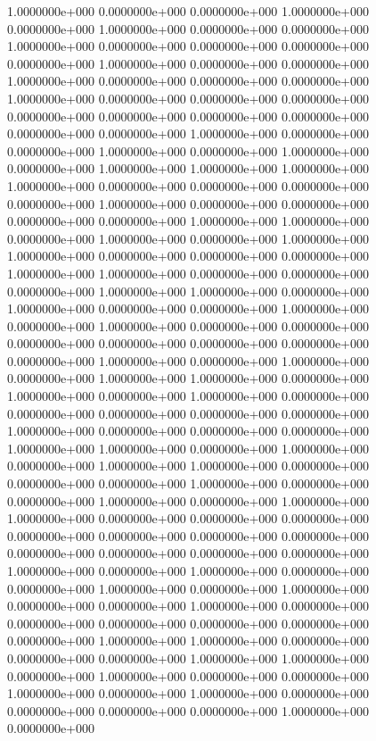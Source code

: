   1.0000000e+000  0.0000000e+000  0.0000000e+000  1.0000000e+000  0.0000000e+000
  1.0000000e+000  0.0000000e+000  0.0000000e+000  1.0000000e+000  0.0000000e+000
  0.0000000e+000  0.0000000e+000  0.0000000e+000  1.0000000e+000  0.0000000e+000
  0.0000000e+000  1.0000000e+000  0.0000000e+000  0.0000000e+000  0.0000000e+000
  1.0000000e+000  0.0000000e+000  0.0000000e+000  0.0000000e+000  0.0000000e+000
  0.0000000e+000  0.0000000e+000  0.0000000e+000  0.0000000e+000  0.0000000e+000
  1.0000000e+000  0.0000000e+000  0.0000000e+000  1.0000000e+000  0.0000000e+000
  1.0000000e+000  0.0000000e+000  1.0000000e+000  1.0000000e+000  1.0000000e+000
  1.0000000e+000  0.0000000e+000  0.0000000e+000  0.0000000e+000  0.0000000e+000
  1.0000000e+000  0.0000000e+000  0.0000000e+000  0.0000000e+000  0.0000000e+000
  1.0000000e+000  1.0000000e+000  0.0000000e+000  1.0000000e+000  0.0000000e+000
  1.0000000e+000  1.0000000e+000  0.0000000e+000  0.0000000e+000  0.0000000e+000
  1.0000000e+000  1.0000000e+000  0.0000000e+000  0.0000000e+000  0.0000000e+000
  1.0000000e+000  1.0000000e+000  0.0000000e+000  1.0000000e+000  0.0000000e+000
  0.0000000e+000  1.0000000e+000  0.0000000e+000  1.0000000e+000  0.0000000e+000
  0.0000000e+000  0.0000000e+000  0.0000000e+000  0.0000000e+000  0.0000000e+000
  0.0000000e+000  1.0000000e+000  0.0000000e+000  1.0000000e+000  0.0000000e+000
  1.0000000e+000  1.0000000e+000  0.0000000e+000  1.0000000e+000  0.0000000e+000
  1.0000000e+000  0.0000000e+000  0.0000000e+000  0.0000000e+000  0.0000000e+000
  0.0000000e+000  1.0000000e+000  0.0000000e+000  0.0000000e+000  0.0000000e+000
  1.0000000e+000  1.0000000e+000  0.0000000e+000  1.0000000e+000  0.0000000e+000
  1.0000000e+000  1.0000000e+000  0.0000000e+000  0.0000000e+000  0.0000000e+000
  1.0000000e+000  0.0000000e+000  0.0000000e+000  1.0000000e+000  0.0000000e+000
  1.0000000e+000  1.0000000e+000  0.0000000e+000  0.0000000e+000  0.0000000e+000
  0.0000000e+000  0.0000000e+000  0.0000000e+000  0.0000000e+000  0.0000000e+000
  0.0000000e+000  0.0000000e+000  0.0000000e+000  1.0000000e+000  0.0000000e+000
  1.0000000e+000  0.0000000e+000  0.0000000e+000  1.0000000e+000  0.0000000e+000
  1.0000000e+000  0.0000000e+000  0.0000000e+000  1.0000000e+000  0.0000000e+000
  0.0000000e+000  0.0000000e+000  0.0000000e+000  0.0000000e+000  0.0000000e+000
  1.0000000e+000  1.0000000e+000  0.0000000e+000  0.0000000e+000  0.0000000e+000
  1.0000000e+000  1.0000000e+000  0.0000000e+000  1.0000000e+000  0.0000000e+000
  0.0000000e+000  1.0000000e+000  0.0000000e+000  1.0000000e+000  0.0000000e+000
  0.0000000e+000  0.0000000e+000  0.0000000e+000  1.0000000e+000  0.0000000e+000
